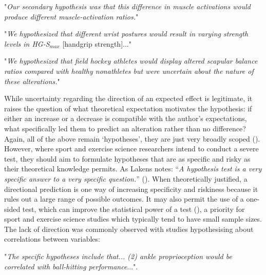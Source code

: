 \documentclass[
]{article}
\begin{document}
\begin{center}

"\textit{Our secondary hypothesis was that this difference in muscle activations would produce different muscle-activation ratios.}"

"\textit{We hypothesized that different wrist postures would result in varying strength levels in HG-S$_{max}$} [handgrip strength]..."

"\textit{We hypothesized that field hockey athletes would display altered scapular balance ratios compared with healthy nonathletes but were uncertain about the nature of these alterations.}"

\end{center}

While uncertainty regarding the direction of an expected effect is
legitimate, it raises the question of what theoretical expectation
motivates the hypothesis: if either an increase or a decrease is
compatible with the author's expectations, what specifically led them to
predict an alteration rather than no difference? Again, all of the above
remain `hypotheses', they are just very broadly scoped
(). However,
where sport and exercise science researchers intend to conduct a severe
test, they should aim to formulate hypotheses that are as specific and
risky as their theoretical knowledge permits. As Lakens notes: ``\emph{A
hypothesis test is a very specific answer to a very specific
question.}'' (). When theoretically justified, a directional prediction is one way
of increasing specificity and riskiness because it rules out a large
range of possible outcomes. It may also permit the use of a one-sided
test, which can improve the statistical power of a test
(), a priority for sport and
exercise science studies which typically tend to have small sample
sizes. The lack of direction was commonly observed with studies
hypothesising about correlations between variables:

\begin{center}

"\textit{The specific hypotheses include that... (2) ankle proprioception would be correlated with ball-hitting performance}...".

\end{center}
\end{document}
